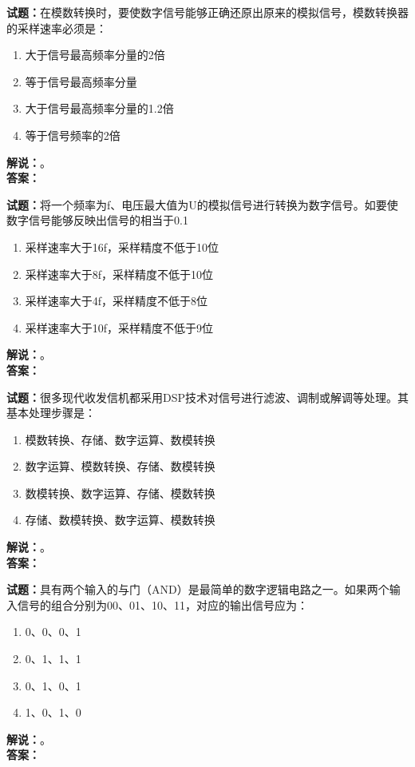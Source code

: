 \documentclass{ctexbook}
\begin{document}
\bigskip




\noindent\textbf{试题：}在模数转换时，要使数字信号能够正确还原出原来的模拟信号，模数转换器的采样速率必须是：
\begin{enumerate}[leftmargin=3em]
\item 大于信号最高频率分量的2倍
\item 等于信号最高频率分量
\item 大于信号最高频率分量的1.2倍
\item 等于信号频率的2倍
\end{enumerate}
\noindent\textbf{解说：}\textbf{}。\\\noindent\textbf{答案：}

\bigskip




\noindent\textbf{试题：}将一个频率为f、电压最大值为U的模拟信号进行转换为数字信号。如要使数字信号能够反映出信号的相当于0.1%
\begin{enumerate}[leftmargin=3em]
\item 采样速率大于16f，采样精度不低于10位
\item 采样速率大于8f，采样精度不低于10位
\item 采样速率大于4f，采样精度不低于8位
\item 采样速率大于10f，采样精度不低于9位
\end{enumerate}
\noindent\textbf{解说：}\textbf{}。\\\noindent\textbf{答案：}

\bigskip




\noindent\textbf{试题：}很多现代收发信机都采用DSP技术对信号进行滤波、调制或解调等处理。其基本处理步骤是：
\begin{enumerate}[leftmargin=3em]
\item 模数转换、存储、数字运算、数模转换
\item 数字运算、模数转换、存储、数模转换
\item 数模转换、数字运算、存储、模数转换
\item 存储、数模转换、数字运算、模数转换
\end{enumerate}
\noindent\textbf{解说：}\textbf{}。\\\noindent\textbf{答案：}

\bigskip




\noindent\textbf{试题：}具有两个输入的与门（AND）是最简单的数字逻辑电路之一。如果两个输入信号的组合分别为00、01、10、11，对应的输出信号应为：
\begin{enumerate}[leftmargin=3em]
\item 0、0、0、1
\item 0、1、1、1
\item 0、1、0、1
\item 1、0、1、0
\end{enumerate}
\noindent\textbf{解说：}\textbf{}。\\\noindent\textbf{答案：}
\end{document}
